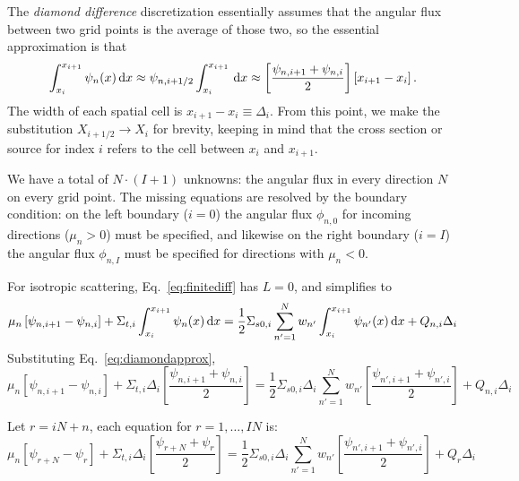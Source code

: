 \documentclass[]{SRJcommon}
\begin{document}
The \emph{diamond difference} discretization essentially assumes that the
angular flux between two grid points is the average of those two, so the
essential approximation is that
\begin{equation}
\int_{x_{i}}^{x_{i+1}} \psi_{n}(x) \, \mathrm{d} x
\approx \psi_{n,i+1/2} \int_{x_{i}}^{x_{i+1}}  \, \mathrm{d} x 
\approx  \left[ \frac{\psi_{n,i+1} + \psi_{n,i}}{2} \right] [x_{i+1} - x_{i}]
\,.
  \label{eq:diamondapprox}
\end{equation}
The width of each spatial cell is $x_{i+1} - x_{i} \equiv \Delta_i$. From this
point, we make the substitution $X_{i+1/2} \to X_{i}$ for brevity, keeping in
mind that the cross section or source for index $i$ refers to the cell between
$x_i$ and $x_{i+1}$.

We have a total of $N\cdot(I+1)$ unknowns: the angular flux in every
direction $N$ on every grid point. The missing equations are resolved by the
boundary condition: on the left boundary ($i=0$) the angular flux $\phi_{n,0}$
for incoming directions ($\mu_n > 0$) must be specified, and likewise on the
right boundary ($i=I$) the angular flux $\phi_{n,I}$ must be specified
for directions with $\mu_n < 0$.

For isotropic scattering, Eq.~\eqref{eq:finitediff} has $L=0$, and simplifies to
$$
 \mu_n \left[ \psi_{n,i+1} - \psi_{n,i} \right] + \Sigma_{t,i}
  \int_{x_{i}}^{x_{i+1}} \psi_n(x) \, \mathrm{d} x
= \frac{1}{2} \Sigma_{s0,i} 
 \sum_{n'=1}^{N} w_{n'}  \int_{x_{i}}^{x_{i+1}} \psi_{n'}(x) \, \mathrm{d} x
  + Q_{n,i}  \Delta_i
$$
Substituting Eq.~\eqref{eq:diamondapprox},
$$ 
\mu_n \left[ \psi_{n,i+1} - \psi_{n,i} \right]
+ \Sigma_{t,i} \Delta_i \left[ \frac{\psi_{n,i+1} + \psi_{n,i}}{2} \right]
=
\frac{1}{2} \Sigma_{s0,i} \Delta_i 
\sum_{n'=1}^{N} w_{n'} \left[ \frac{\psi_{n',i+1} + \psi_{n',i}}{2} \right]
  + Q_{n,i} \Delta_i
$$

Let $r = iN + n$, each equation for $r = 1, \ldots, IN$ is:
$$
\mu_n \left[ \psi_{r + N} - \psi_{r} \right]
+ \Sigma_{t,i} \Delta_i \left[ \frac{\psi_{r + N} + \psi_{r}}{2} \right]
=
\frac{1}{2} \Sigma_{s0,i} \Delta_i 
\sum_{n'=1}^{N} w_{n'} \left[ \frac{\psi_{n',i+1} + \psi_{n',i}}{2} \right]
  + Q_{r} \Delta_i
$$

\nocite{Lew1984,Lar2007}


\end{document}
